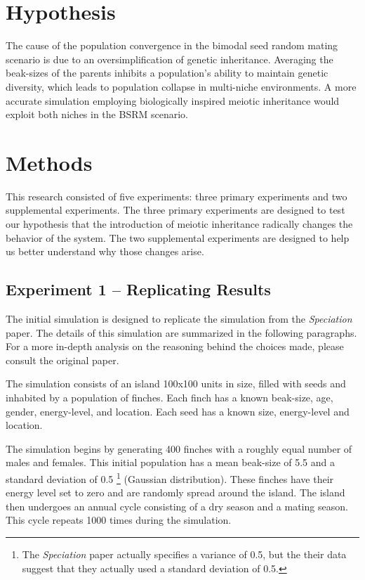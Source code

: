 \documentclass{article}
\begin{document}
\section{Hypothesis}

The cause of the population convergence in the bimodal seed random mating scenario is due to an oversimplification of genetic inheritance. Averaging the beak-sizes of the parents inhibits a population’s ability to maintain genetic diversity, which leads to population collapse in multi-niche environments. A more accurate simulation employing biologically inspired meiotic inheritance would exploit both niches in the BSRM scenario.



\section{Methods}

This research consisted of five experiments: three primary experiments and two supplemental experiments. The three primary experiments are designed to test our hypothesis that the introduction of meiotic inheritance radically changes the behavior of the system. The two supplemental experiments are designed to help us better understand why those changes arise. 



\subsection{Experiment 1 -- Replicating Results}

The initial simulation is designed to replicate the simulation from the \textit{Speciation} paper. The details of this simulation are summarized in the following paragraphs. For a more in-depth analysis on the reasoning behind the choices made, please consult the original paper. 

The simulation consists of an island 100x100 units in size, filled with seeds and inhabited by a population of finches. Each finch has a known beak-size, age, gender, energy-level, and location. Each seed has a known size, energy-level and location.

The simulation begins by generating 400 finches with a roughly equal number of males and females. This initial population has a mean beak-size of  5.5 and a standard deviation of 0.5 \footnote{The \textit{Speciation} paper actually specifies a variance of 0.5, but the their data suggest that they actually used a standard deviation of 0.5.} (Gaussian distribution). These finches have their energy level set to zero and are randomly spread around the island. The island then undergoes an annual cycle consisting of a dry season and a mating season. This cycle repeats 1000 times during the simulation. 
\end{document}
